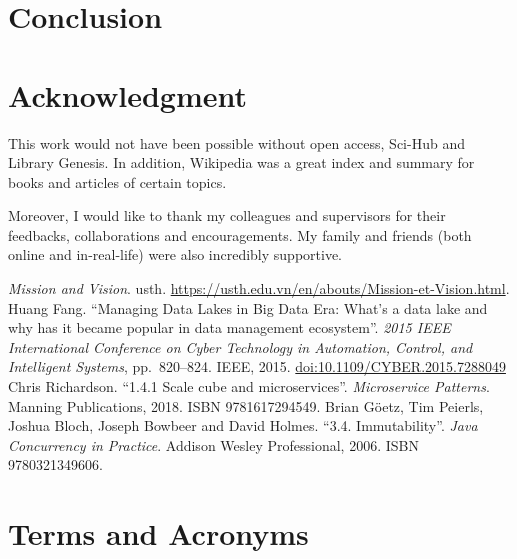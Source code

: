 \documentclass[a4paper,oneside,12pt]{book}
\newcommand{\doi}[1]{\href{https://doi.org/#1}{doi:#1}}
\begin{document}
\chapter{Conclusion}

\begin{appendices}
\chapter{Acknowledgment}
This work would not have been possible without open access,
Sci-Hub and Library Genesis.  In addition, Wikipedia was a great index
and summary for books and articles of certain topics.

Moreover, I would like to thank my colleagues and supervisors
for their feedbacks, collaborations and encouragements.  My family and friends
(both online and in-real-life) were also incredibly supportive.

\begin{thebibliography}{69}
   \emph{Mission and Vision}.  \acrlong{usth}.
    \url{https://usth.edu.vn/en/abouts/Mission-et-Vision.html}.
   Huang Fang.
    ``Managing Data Lakes in Big Data Era: What's a data lake
    and why has it became popular in data management ecosystem''.
    \emph{2015 IEEE International Conference on Cyber Technology
    in Automation, Control, and Intelligent Systems}, pp.~820--824.
    IEEE, 2015.  \doi{10.1109/CYBER.2015.7288049}
   Chris Richardson.
    ``1.4.1 Scale cube and microservices''.  \emph{Microservice Patterns}.
    Manning Publications, 2018.  ISBN 9781617294549.
   Brian Göetz, Tim Peierls, Joshua Bloch,
    Joseph Bowbeer and David Holmes.
    ``3.4. Immutability''.  \emph{Java Concurrency in Practice}.
    Addison Wesley Professional, 2006.  ISBN 9780321349606.
\end{thebibliography}

\chapter{Terms and Acronyms}
\printglossaries
\end{appendices}
\end{document}
